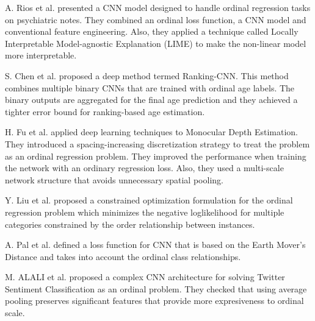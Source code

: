 \documentclass[journal]{IEEEtran}
\begin{document}
	A. Rios et al. \cite{rios2017ordinal} presented a CNN model designed to handle ordinal regression tasks on psychiatric notes. They combined an ordinal loss function, a CNN model and conventional feature engineering. Also, they applied a technique called Locally Interpretable Model-agnostic Explanation (LIME) to make the non-linear model more interpretable.
	
	S. Chen et al. \cite{chen2017using} proposed a deep method termed Ranking-CNN. This method combines multiple binary CNNs that are trained with ordinal age labels. The binary outputs are aggregated for the final age prediction and they achieved a tighter error bound for ranking-based age estimation.
	
	H. Fu et al. \cite{fu2018deep} applied deep learning techniques to Monocular Depth Estimation. They introduced a spacing-increasing discretization strategy to treat the problem as an ordinal regression problem. They improved the performance when training the network with an ordinary regression loss. Also, they used a multi-scale network structure that avoids unnecessary spatial pooling.
	
	Y. Liu et al. \cite{liu2018constrained} proposed a constrained optimization formulation for the ordinal regression problem which minimizes the negative loglikelihood for multiple categories constrained by the order relationship between instances.
	
	A. Pal et al. \cite{pal2018severity} defined a loss function for CNN that is based on the Earth Mover's Distance and takes into account the ordinal class relationships.
	
	M. ALALI et al. \cite{alali2018multi} proposed a complex CNN architecture for solving Twitter Sentiment Classification as an ordinal problem. They checked that using average pooling preserves significant features that provide more expresiveness to ordinal scale.
	
\end{document}

